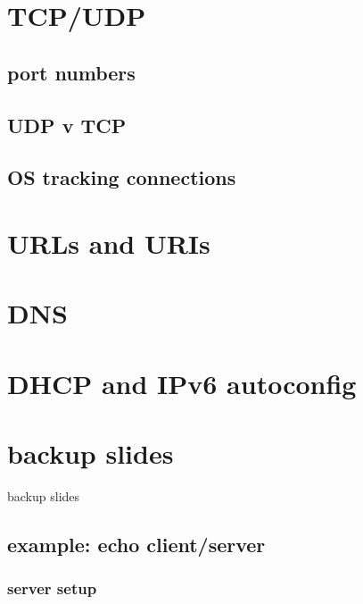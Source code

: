 

\section{TCP/UDP}

\subsection{port numbers}


\subsection{UDP v TCP}


\subsection{OS tracking connections}


\section{URLs and URIs}



\section{DNS}


\section{DHCP and IPv6 autoconfig}




\section{backup slides}
\begin{frame}{backup slides}
\end{frame}

\subsection{example: echo client/server}
\subsubsection{server setup}

